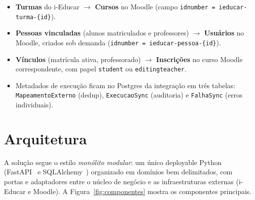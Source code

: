 \documentclass[
	12pt,
	oneside,
	a4paper,
	chapter=TITLE,
	section=TITLE,
	sumario=tradicional,
	english,
	brazil
]{abntex2}
\begin{document}
\begin{itemize}
    \item \textbf{Turmas} do i-Educar $\rightarrow$ \textbf{Cursos} no Moodle (campo
    \texttt{idnumber = ieducar-turma-\{id\}}).
    \item \textbf{Pessoas vinculadas} (alunos matriculados e professores) $\rightarrow$
    \textbf{Usuários} no Moodle, criados sob demanda (\texttt{idnumber =
    ieducar-pessoa-\{id\}}).
    \item \textbf{Vínculos} (matrícula ativa, professorado) $\rightarrow$ \textbf{Inscrições}
    no curso Moodle correspondente, com papel \texttt{student} ou \texttt{editingteacher}.
    \item Metadados de execução ficam no Postgres da integração em três tabelas:
    \texttt{MapeamentoExterno} (dedup), \texttt{ExecucaoSync} (auditoria) e
    \texttt{FalhaSync} (erros individuais).
\end{itemize}

\chapter{Arquitetura}

A solução segue o estilo \emph{monólito modular}: um único deployable Python
(FastAPI~\cite{fastapi} e SQLAlchemy~\cite{sqlalchemy}) organizado
em domínios bem delimitados, com portas e adaptadores entre o núcleo de negócio e as
infraestruturas externas (i-Educar e Moodle). A Figura~\ref{fig:componentes} mostra os
componentes principais.
\end{document}
